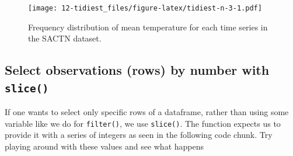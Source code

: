 \documentclass[]{book}
\newenvironment{Shaded}{\begin{snugshade}}{\end{snugshade}}
\newcommand{\KeywordTok}[1]{\textcolor[rgb]{0.13,0.29,0.53}{\textbf{#1}}}
\newcommand{\DataTypeTok}[1]{\textcolor[rgb]{0.13,0.29,0.53}{#1}}
\newcommand{\FloatTok}[1]{\textcolor[rgb]{0.00,0.00,0.81}{#1}}
\newcommand{\StringTok}[1]{\textcolor[rgb]{0.31,0.60,0.02}{#1}}
\newcommand{\OperatorTok}[1]{\textcolor[rgb]{0.81,0.36,0.00}{\textbf{#1}}}
\newcommand{\NormalTok}[1]{#1}
\theoremstyle{definition}
\theoremstyle{definition}
\theoremstyle{definition}
\theoremstyle{remark}
\begin{document}
\begin{Shaded}
\end{Shaded}

\begin{figure}
\centering
\texttt{[image: 12-tidiest\_files/figure-latex/tidiest-n-3-1.pdf]}
\caption{\label{fig:tidiest-n-3}Frequency distribution of mean temperature
for each time series in the SACTN dataset.}
\end{figure}

\subsection{\texorpdfstring{Select observations (rows) by number with
\texttt{slice()}}{Select observations (rows) by number with slice()}}\label{select-observations-rows-by-number-with-slice}

If one wants to select only specific rows of a dataframe, rather than
using some variable like we do for \texttt{filter()}, we use
\texttt{slice()}. The function expects us to provide it with a series of
integers as seen in the following code chunk. Try playing around with
these values and see what happens
\end{document}
